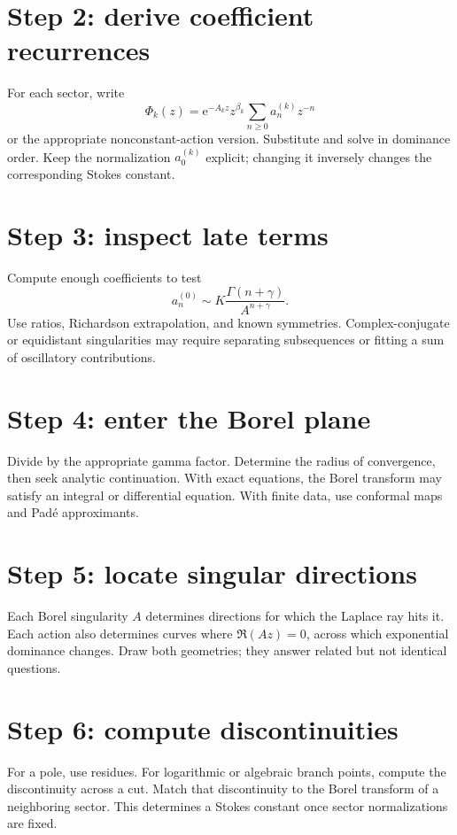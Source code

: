 \documentclass[11pt,oneside]{book}
\theoremstyle{definition}
\theoremstyle{remark}
\newcommand{\e}{\mathrm{e}}
\begin{document}
\section{Step 2: derive coefficient recurrences}

For each sector, write
\[
  \Phi_k(z)=\e^{-A_k z}z^{\beta_k}
  \sum_{n\ge0}a_n^{(k)}z^{-n}
\]
or the appropriate nonconstant-action version. Substitute and solve in dominance
order. Keep the normalization $a_0^{(k)}$ explicit; changing it inversely changes
the corresponding Stokes constant.

\section{Step 3: inspect late terms}

Compute enough coefficients to test
\[
  a_n^{(0)}\sim
  K\frac{\Gamma(n+\gamma)}{A^{n+\gamma}}.
\]
Use ratios, Richardson extrapolation, and known symmetries. Complex-conjugate or
equidistant singularities may require separating subsequences or fitting a sum
of oscillatory contributions.

\section{Step 4: enter the Borel plane}

Divide by the appropriate gamma factor. Determine the radius of convergence,
then seek analytic continuation. With exact equations, the Borel transform may
satisfy an integral or differential equation. With finite data, use conformal
maps and Pad\'e approximants.

\section{Step 5: locate singular directions}

Each Borel singularity $A$ determines directions for which the Laplace ray hits
it. Each action also determines curves where $\Re(Az)=0$, across which
exponential dominance changes. Draw both geometries; they answer related but not
identical questions.

\section{Step 6: compute discontinuities}

For a pole, use residues. For logarithmic or algebraic branch points, compute the
discontinuity across a cut. Match that discontinuity to the Borel transform of a
neighboring sector. This determines a Stokes constant once sector normalizations
are fixed.
\end{document}
